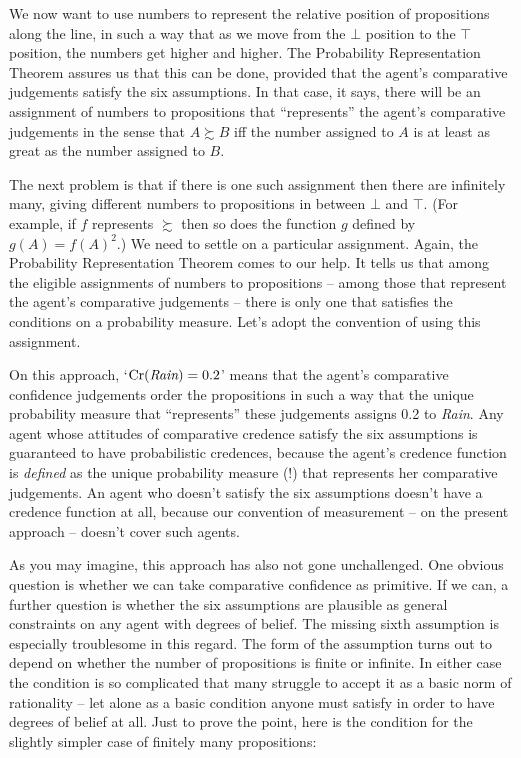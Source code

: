 We now want to use numbers to represent the relative position of propositions
along the line, in such a way that as we move from the $\bot$ position to the
$\top$ position, the numbers get higher and higher. The Probability
Representation Theorem assures us that this can be done, provided that the
agent's comparative judgements satisfy the six assumptions. In that case, it
says, there will be an assignment of numbers to propositions that ``represents''
the agent's comparative judgements in the sense that $A \succsim B$ iff the
number assigned to $A$ is at least as great as the number assigned to $B$.

The next problem is that if there is one such assignment then there are
infinitely many, giving different numbers to propositions in between $\bot$ and
$\top$. (For example, if $f$ represents $\succsim$ then so does the function $g$
defined by $g(A) = f(A)^{2}$.) We need to settle on a particular assignment.
Again, the Probability Representation Theorem comes to our help. It tells us
that among the eligible assignments of numbers to propositions -- among those
that represent the agent's comparative judgements -- there is only one that
satisfies the conditions on a probability measure. Let's adopt the convention of
using this assignment.

On this approach, `$\text{Cr}(\emph{Rain}) = 0.2$' means that the agent's comparative
confidence judgements order the propositions in such a way that the unique
probability measure that ``represents'' these judgements assigns 0.2 to
\emph{Rain}. Any agent whose attitudes of comparative credence satisfy the six
assumptions is guaranteed to have probabilistic credences, because the agent's
credence function is \emph{defined} as the unique probability measure (!) that
represents her comparative judgements. An agent who doesn't satisfy the six
assumptions doesn't have a credence function at all, because our convention of
measurement -- on the present approach -- doesn't cover such agents.

As you may imagine, this approach has also not gone unchallenged. One obvious
question is whether we can take comparative confidence as primitive. If we can,
a further question is whether the six assumptions are plausible as general
constraints on any agent with degrees of belief. The missing sixth assumption is
especially troublesome in this regard. The form of the assumption turns out to
depend on whether the number of propositions is finite or infinite. In either
case the condition is so complicated that many struggle to accept it as a basic
norm of rationality -- let alone as a basic condition anyone must satisfy in
order to have degrees of belief at all. Just to prove the point, here is the
condition for the slightly simpler case of finitely many propositions:

